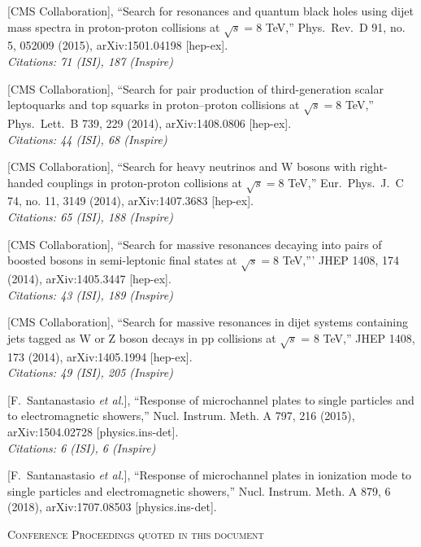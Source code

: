 \documentclass[10pt, a4paper]{article}
\begin{document}
\begin{thebibliography}{599}
  [CMS Collaboration],
  ``Search for resonances and quantum black holes using dijet mass
  spectra in proton-proton collisions at $\sqrt{s}=8$ TeV,''
  Phys.\ Rev.\ D 91, no. 5, 052009 (2015), arXiv:1501.04198 [hep-ex].\\
\emph{Citations: 71 (ISI), 187 (Inspire)}

  [CMS Collaboration],
  ``Search for pair production of third-generation scalar leptoquarks
  and top squarks in proton–proton collisions at $\sqrt{s}=8$ TeV,''
  Phys.\ Lett.\ B 739, 229 (2014), arXiv:1408.0806 [hep-ex].\\
\emph{Citations: 44 (ISI), 68 (Inspire)}

  [CMS Collaboration],
  ``Search for heavy neutrinos and $\mathrm {W}$ bosons with
  right-handed couplings in proton-proton collisions at $\sqrt{s}=8$ TeV,''
  Eur.\ Phys.\ J.\ C 74, no. 11, 3149 (2014), arXiv:1407.3683 [hep-ex].\\
\emph{Citations: 65 (ISI), 188 (Inspire)}

  [CMS Collaboration],
  ``Search for massive resonances decaying into pairs of boosted
  bosons in semi-leptonic final states at $\sqrt{s}=8$ TeV,'''
  JHEP 1408, 174 (2014), arXiv:1405.3447 [hep-ex].\\
\emph{Citations: 43 (ISI), 189 (Inspire)}

 [CMS Collaboration],
  ``Search for massive resonances in dijet systems containing jets
  tagged as W or Z boson decays in pp collisions at $ \sqrt{s} $ = 8 TeV,''
  JHEP 1408, 173 (2014), arXiv:1405.1994 [hep-ex].\\
\emph{Citations: 49 (ISI), 205 (Inspire)}

[F.~Santanastasio {\it et al.}],
  ``Response of microchannel plates to single particles and to electromagnetic showers,''
Nucl. Instrum. Meth. A 797, 216 (2015), arXiv:1504.02728 [physics.ins-det].\\
\emph{Citations: 6 (ISI), 6 (Inspire)}

[F.~Santanastasio {\it et al.}],
  ``Response of microchannel plates in ionization mode to single particles and electromagnetic showers,''
  Nucl. Instrum. Meth. A 879, 6 (2018), arXiv:1707.08503 [physics.ins-det].\\

\vspace{0.3cm} \begin{center} \textsc{Conference Proceedings quoted in
    this document} \end{center} \vspace{0.05cm}


\end{thebibliography}
\end{document}
